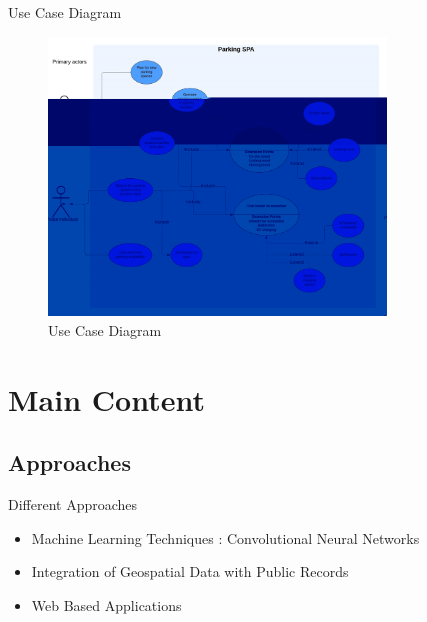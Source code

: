 \documentclass{beamer}
\begin{document}
\begin{frame}{Use Case Diagram}
    \begin{figure}
        \centering
        \includegraphics[width=0.8\textwidth]{Use_case_diagram_Parking_SPA.jpeg}
        \caption{Use Case Diagram}
        \label{fig:use_case_diagram}
    \end{figure}
\end{frame}


\section{Main Content}
\subsection{Approaches}
\begin{frame}{Different Approaches}
    \begin{itemize}
        \item{Machine Learning Techniques : Convolutional Neural Networks}
        \item{Integration of Geospatial Data with Public Records}
        \item{Web Based Applications}
    \end{itemize}
\end{frame}
\end{document}
